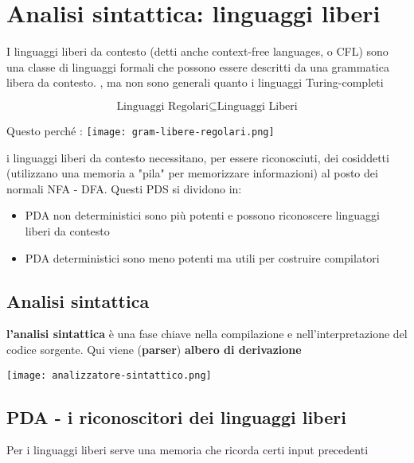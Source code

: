 \section{Analisi sintattica: linguaggi liberi}
I linguaggi liberi da contesto (detti anche context-free languages, o CFL) sono una classe di linguaggi formali che possono essere descritti da una grammatica libera da contesto. , ma non sono generali quanto i linguaggi Turing-completi

\[
        \text{Linguaggi Regolari} \subseteq \text{Linguaggi Liberi}
\]

Questo perché :
\texttt{[image: gram-libere-regolari.png]}

i linguaggi liberi da contesto necessitano, per essere riconosciuti, dei cosiddetti  (utilizzano una memoria a "pila" per memorizzare informazioni) al posto dei normali NFA - DFA. Questi PDS si dividono in:
\begin{itemize}
    \item PDA non deterministici sono più potenti e possono riconoscere linguaggi liberi da contesto
    \item PDA deterministici sono meno potenti ma utili per costruire compilatori
\end{itemize}  
\subsection{Analisi sintattica}

\textbf{l'analisi sintattica} è una fase chiave nella compilazione e nell'interpretazione del codice sorgente. Qui viene  (\textbf{parser})  \textbf{albero di derivazione}

\texttt{[image: analizzatore-sintattico.png]}

\subsection{PDA - i riconoscitori dei linguaggi liberi}

Per i linguaggi liberi serve una memoria che ricorda certi input precedenti


